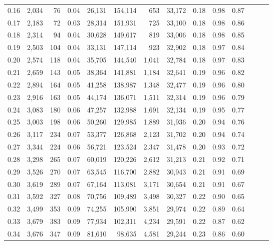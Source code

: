 \begin{tabular}{rrrrrrrrrrrrrr}
0.16 &  2,034 &   76 &  0.04 &   26,131 &  154,114 &     653 &  33,172 &  0.18 &  0.98 &      0.87 \\
0.17 &  2,183 &   72 &  0.03 &   28,314 &  151,931 &     725 &  33,100 &  0.18 &  0.98 &      0.86 \\
0.18 &  2,314 &   94 &  0.04 &   30,628 &  149,617 &     819 &  33,006 &  0.18 &  0.98 &      0.85 \\
0.19 &  2,503 &  104 &  0.04 &   33,131 &  147,114 &     923 &  32,902 &  0.18 &  0.97 &      0.84 \\
0.20 &  2,574 &  118 &  0.04 &   35,705 &  144,540 &   1,041 &  32,784 &  0.18 &  0.97 &      0.83 \\
0.21 &  2,659 &  143 &  0.05 &   38,364 &  141,881 &   1,184 &  32,641 &  0.19 &  0.96 &      0.82 \\
0.22 &  2,894 &  164 &  0.05 &   41,258 &  138,987 &   1,348 &  32,477 &  0.19 &  0.96 &      0.80 \\
0.23 &  2,916 &  163 &  0.05 &   44,174 &  136,071 &   1,511 &  32,314 &  0.19 &  0.96 &      0.79 \\
0.24 &  3,083 &  180 &  0.06 &   47,257 &  132,988 &   1,691 &  32,134 &  0.19 &  0.95 &      0.77 \\
0.25 &  3,003 &  198 &  0.06 &   50,260 &  129,985 &   1,889 &  31,936 &  0.20 &  0.94 &      0.76 \\
0.26 &  3,117 &  234 &  0.07 &   53,377 &  126,868 &   2,123 &  31,702 &  0.20 &  0.94 &      0.74 \\
0.27 &  3,344 &  224 &  0.06 &   56,721 &  123,524 &   2,347 &  31,478 &  0.20 &  0.93 &      0.72 \\
0.28 &  3,298 &  265 &  0.07 &   60,019 &  120,226 &   2,612 &  31,213 &  0.21 &  0.92 &      0.71 \\
0.29 &  3,526 &  270 &  0.07 &   63,545 &  116,700 &   2,882 &  30,943 &  0.21 &  0.91 &      0.69 \\
0.30 &  3,619 &  289 &  0.07 &   67,164 &  113,081 &   3,171 &  30,654 &  0.21 &  0.91 &      0.67 \\
0.31 &  3,592 &  327 &  0.08 &   70,756 &  109,489 &   3,498 &  30,327 &  0.22 &  0.90 &      0.65 \\
0.32 &  3,499 &  353 &  0.09 &   74,255 &  105,990 &   3,851 &  29,974 &  0.22 &  0.89 &      0.64 \\
0.33 &  3,679 &  383 &  0.09 &   77,934 &  102,311 &   4,234 &  29,591 &  0.22 &  0.87 &      0.62 \\
0.34 &  3,676 &  347 &  0.09 &   81,610 &   98,635 &   4,581 &  29,244 &  0.23 &  0.86 &      0.60 \\

\end{tabular}
